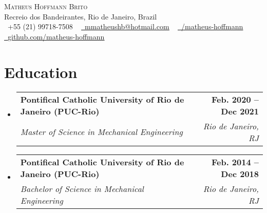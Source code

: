 \documentclass[letterpaper,11pt]{article}
\makeatletter
\newcommand{\resumeSubheading}[4]{
  \vspace{-2pt}\item
    \begin{tabular*}{1.0\textwidth}[t]{l@{\extracolsep{\fill}}r}
      \textbf{#1} & \textbf{\small #2} \\
      \textit{\small#3} & \textit{\small #4} \\
    \end{tabular*}\vspace{-7pt}
}
\newcommand{\resumeSubHeadingListStart}{\begin{itemize}[leftmargin=0.0in, label={}]}
\newcommand{\resumeSubHeadingListEnd}{\end{itemize}}
\makeatother
\begin{document}

\begin{center}
    {\Huge \scshape Matheus Hoffmann Brito} \\ \vspace{1pt}
    Recreio dos Bandeirantes, Rio de Janeiro, Brazil \\ \vspace{1pt}
    \small \raisebox{-0.1\height}\faPhone\ +55 (21) 99718-7508 ~ \href{mailto:x@gmail.com}{\raisebox{-0.2\height}\faEnvelope\  \underline{mmatheushb@hotmail.com}} ~ 
    \href{https://linkedin.com/in//}{\raisebox{-0.2\height}\faLinkedin\ \underline{/matheus-hoffmann}}  ~
    \href{https://github.com/}{\raisebox{-0.2\height}\faGithub\ \underline{github.com/matheus-hoffmann}}
    \vspace{-8pt}
\end{center}


\section{Education}
\resumeSubHeadingListStart
\resumeSubheading
{Pontifical Catholic University of Rio de Janeiro (PUC-Rio)}{Feb. 2020 -- Dec 2021}
{Master of Science in Mechanical Engineering}{Rio de Janeiro, RJ}
\resumeSubheading
{Pontifical Catholic University of Rio de Janeiro (PUC-Rio)}{Feb. 2014 -- Dec 2018}
{Bachelor of Science in Mechanical Engineering}{Rio de Janeiro, RJ}
\resumeSubHeadingListEnd


\end{document}
